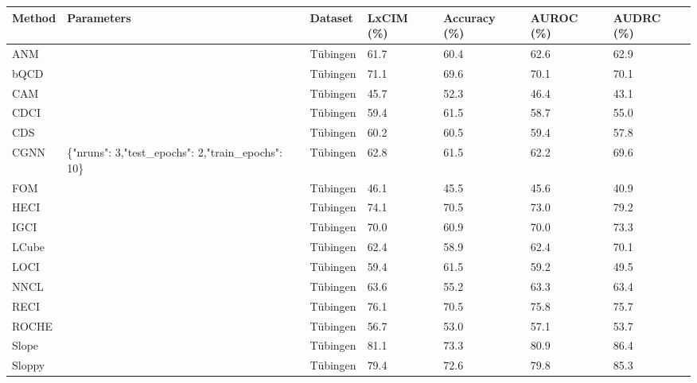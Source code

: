 \begin{tabular}{lllllll}
\toprule
Method & Parameters & Dataset & LxCIM (\%) & Accuracy (\%) & AUROC (\%) & AUDRC (\%) \\
\midrule
ANM &  & Tübingen & 61.7 & 60.4 & 62.6 & 62.9 \\
bQCD &  & Tübingen & 71.1 & 69.6 & 70.1 & 70.1 \\
CAM &  & Tübingen & 45.7 & 52.3 & 46.4 & 43.1 \\
CDCI &  & Tübingen & 59.4 & 61.5 & 58.7 & 55.0 \\
CDS &  & Tübingen & 60.2 & 60.5 & 59.4 & 57.8 \\
CGNN & \{"nruns": 3,"test\_epochs": 2,"train\_epochs": 10\} & Tübingen & 62.8 & 61.5 & 62.2 & 69.6 \\
FOM &  & Tübingen & 46.1 & 45.5 & 45.6 & 40.9 \\
HECI &  & Tübingen & 74.1 & 70.5 & 73.0 & 79.2 \\
IGCI &  & Tübingen & 70.0 & 60.9 & 70.0 & 73.3 \\
LCube &  & Tübingen & 62.4 & 58.9 & 62.4 & 70.1 \\
LOCI &  & Tübingen & 59.4 & 61.5 & 59.2 & 49.5 \\
NNCL &  & Tübingen & 63.6 & 55.2 & 63.3 & 63.4 \\
RECI &  & Tübingen & 76.1 & 70.5 & 75.8 & 75.7 \\
ROCHE &  & Tübingen & 56.7 & 53.0 & 57.1 & 53.7 \\
Slope &  & Tübingen & 81.1 & 73.3 & 80.9 & 86.4 \\
Sloppy &  & Tübingen & 79.4 & 72.6 & 79.8 & 85.3 \\
\bottomrule
\end{tabular}
